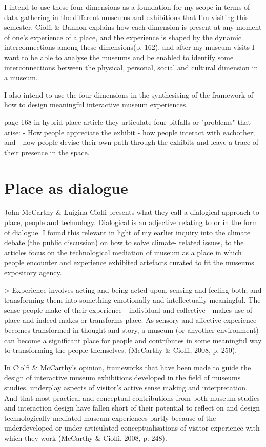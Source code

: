 I intend to use these four dimensions as a foundation for my scope in terms of data-gathering in the different museums and exhibitions that I’m visiting this semester. Ciolfi & Bannon explains how each dimension is present at any moment of one’s experience of a place, and the experience is shaped by the dynamic interconnections among these dimensions(p. 162), and after my museum visits I want to be able to analyse the museums and be enabled to identify some interconnections between the physical, personal, social and cultural dimension in a museum.

I also intend to use the four dimensions in the synthesising of the framework of how to design meaningful interactive museum experiences. 


page 168 in hybrid place article they articulate four pitfalls or "problems" that arise:
- How people appreciate the exhibit
- how people interact with eachother; and
- how people devise their own path through the exhibits and leave a trace of their presence in the space.

\section{Place as dialogue}

John McCarthy & Luigina Ciolfi presents what they call a dialogical approach to place, people and technology. Dialogical is an adjective relating to or in the form of dialogue. I found this relevant in light of my earlier inquiry into the climate debate (the public discussion) on how to solve climate- related issues, to the articles focus on the technological mediation of museum as a place in which people encounter and experience exhibited artefacts curated to fit the museums expository agency.

> Experience involves acting and being acted upon, sensing and feeling both, and transforming them into something emotionally and intellectually meaningful. The sense people make of their experience—individual and collective—makes use of place and indeed makes or transforms place. As sensory and affective experience becomes transformed in thought and story, a museum (or anyother environment) can become a significant place for people and contributes in some meaningful way to transforming the people themselves. (McCarthy & Ciolfi, 2008, p. 250).

In Ciolfi & McCarthy’s opinion, frameworks that have been made to guide the design of interactive museum exhibitions developed in the field of museums studies, underplay aspects of visitor’s active sense making and interpretation. And that most practical and conceptual contributions from both museum studies and interaction design have fallen short of their potential to reflect on and design technologically mediated museum experiences partly because of the underdeveloped or under-articulated conceptualisations of visitor experience with which they work (McCarthy & Ciolfi, 2008, p. 248). 

